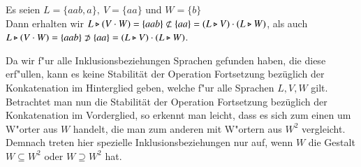 \vspace{2ex}

\begin{beispiel}
Es seien $L=\{aab,a\},\ V=\{aa\}$ und $W=\{b\}$\\
Dann erhalten wir $L\triangleright (V\cdot W) = \{aab\} \not\subset \{aa\} = (L\triangleright V) \cdot (L\triangleright W)$, als auch $L\triangleright (V\cdot W) = \{aab\} \not\supset \{aa\} = (L\triangleright V) \cdot (L\triangleright W)$.
\end{beispiel}

Da wir f"ur alle Inklusionsbeziehungen Sprachen gefunden haben, die diese erf"ullen, kann es keine Stabilität der Operation Fortsetzung bezüglich der Konkatenation im Hinterglied geben, welche f"ur alle Sprachen $L,V,W$ gilt.\\

Betrachtet man nun die Stabilität der Operation Fortsetzung bezüglich der Konkatenation im Vorderglied, so erkennt man leicht, dass es sich 
zum einen um W"orter aus $W$ handelt, die man zum anderen mit W"ortern aus $W^2$ vergleicht.\\
Demnach treten hier spezielle Inklusionsbeziehungen nur auf, wenn $W$ die Gestalt $W\subseteq W^2$ oder $W\supseteq W^2$ hat.

